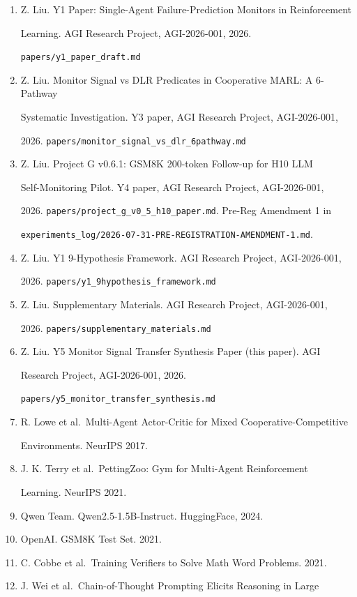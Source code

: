 \documentclass[11pt]{article}
\begin{document}
\begin{enumerate}
\def\labelenumi{\arabic{enumi}.}
\item
  Z. Liu. Y1 Paper: Single-Agent Failure-Prediction Monitors in
  Reinforcement

  Learning. AGI Research Project, AGI-2026-001, 2026.

  \texttt{papers/y1\_paper\_draft.md}
\item
  Z. Liu. Monitor Signal vs DLR Predicates in Cooperative MARL: A
  6-Pathway

  Systematic Investigation. Y3 paper, AGI Research Project,
  AGI-2026-001,

  2026. \texttt{papers/monitor\_signal\_vs\_dlr\_6pathway.md}
\item
  Z. Liu. Project G v0.6.1: GSM8K 200-token Follow-up for H10 LLM

  Self-Monitoring Pilot. Y4 paper, AGI Research Project, AGI-2026-001,

  2026. \texttt{papers/project\_g\_v0\_5\_h10\_paper.md}. Pre-Reg
  Amendment 1 in

  \texttt{experiments\_log/2026-07-31-PRE-REGISTRATION-AMENDMENT-1.md}.
\item
  Z. Liu. Y1 9-Hypothesis Framework. AGI Research Project, AGI-2026-001,

  2026. \texttt{papers/y1\_9hypothesis\_framework.md}
\item
  Z. Liu. Supplementary Materials. AGI Research Project, AGI-2026-001,

  2026. \texttt{papers/supplementary\_materials.md}
\item
  Z. Liu. Y5 Monitor Signal Transfer Synthesis Paper (this paper). AGI

  Research Project, AGI-2026-001, 2026.

  \texttt{papers/y5\_monitor\_transfer\_synthesis.md}
\item
  R. Lowe et al.~Multi-Agent Actor-Critic for Mixed
  Cooperative-Competitive

  Environments. NeurIPS 2017.
\item
  J. K. Terry et al.~PettingZoo: Gym for Multi-Agent Reinforcement

  Learning. NeurIPS 2021.
\item
  Qwen Team. Qwen2.5-1.5B-Instruct. HuggingFace, 2024.
\item
  OpenAI. GSM8K Test Set. 2021.
\item
  C. Cobbe et al.~Training Verifiers to Solve Math Word Problems. 2021.
\item
  J. Wei et al.~Chain-of-Thought Prompting Elicits Reasoning in Large


\end{enumerate}
\end{document}
